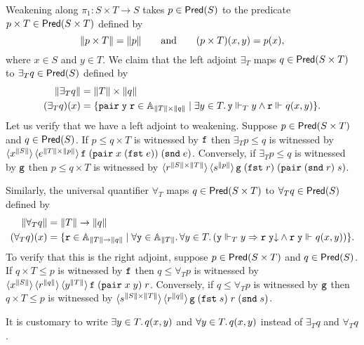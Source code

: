 Weakening along $\pi_1 : S \times T \to S$ takes $p
\in \Pred{S}$ to the predicate $p \times T \in
\Pred{S \times T}$ defined by
%
\begin{equation*}
  \T{p \times T} = \T{p}
  \qquad\text{and}\qquad
  (p \times T)(x,y) = p(x),
\end{equation*}
%
where $x \in S$ and $y \in T$. We claim that the left adjoint
$\exists_{T}$ maps $q \in \Pred{S \times T}$ to
$\exists_{T} q \in \Pred{S}$ defined by
%
\begin{align*}
  \T{\exists_{T} q} &= \T{T} \times \T{q} \\
  (\exists_{T} q)(x) &=
  \set{ \combPair\;\R{y}\;\R{r} \in \Atyp{\T{T} \times \T{q}} \such
    \some{y \in T}{\R{y} \rz[T] y \land \R{r} \rz q(x,y)}
  }.
\end{align*}
%
Let us verify that we have a left adjoint to weakening. Suppose $p \in
\Pred{S \times T}$ and $q \in \Pred{S}$. If $p \leq
q \times T$ is witnessed by $\R{f}$ then $\exists_{T} p
\leq q$ is witnessed by $\tpcalam{x}{\T{S}} \tpcalam{e}{\T{T} \times
    \T{p}}{\R{f}\; (\combPair \; x \; (\combFst\; e)) \; (\combSnd \; e)}$.
Conversely, if $\exists_{T} p \leq q$ is witnessed by $\R{g}$
then $p \leq q \times T$ is witnessed by $\tpcalam{r}{\T{S}
    \times \T{T}} \tpcalam{s}{\T{p}}{\R{g} \;
  (\combFst\;r)\; (\combPair \; (\combSnd \; r) \; s)}$.

Similarly, the universal quantifier $\forall_{T}$ maps $q \in
\Pred{S \times T}$ to $\forall_{T} q \in
\Pred{S}$ defined by
%
\begin{align*}
  \T{\forall_{T} q} &= \T{T} \to \T{q} \\
  (\forall_{T} q)(x) &=
  \set{ \R{r} \in \Atyp{\T{T} \to \T{q}} \such
    \all{\R{y} \in \Atyp{\T{T}}}{
      \all{y \in T}
        (\R{y} \rz[T] y \lthen
        \defined{\R{r}\;\R{y}} \land
        \R{r}\;\R{y} \rz q(x,y))
    }
  }.
\end{align*}
%
To verify that this is the right adjoint, suppose $p \in \Pred{S
  \times T}$ and $q \in \Pred{S}$. If $q \times T
\leq p$ is witnessed by $\R{f}$ then $q \leq \forall_{T} p$ is
witnessed by $\tpcalam{x}{\T{S}} \tpcalam{r}{\T{q}}
  \tpcalam{y}{\T{T}}{\R{f} \; (\combPair \; x \; y) \; r}$. Conversely,
if $q \leq \forall_{T} p$ is witnessed by $\R{g}$ then $q \times
T \leq p$ is witnessed by $\tpcalam{s}{\T{S} \times \T{T}}
  \tpcalam{r}{\T{q}}{\R{g} \; (\combFst \; s) \; r \; (\combSnd \; s)}$.

It is customary to write $\some{y \in T}{q(x,y)}$ and
$\all{y \in T}{q(x,y)}$ instead of $\exists_{T} q$ and
$\forall_{T} q$.

